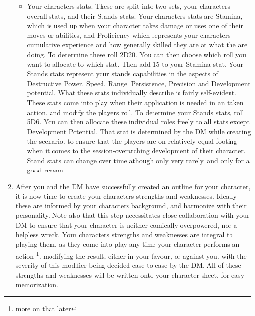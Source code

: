 \documentclass[a4paper,12pt]{article}
\begin{document}
\begin{enumerate}
\begin{itemize}
		\item Your characters stats. These are split into two sets, your characters overall stats, and their Stands stats. Your characters stats are Stamina, which is used up when your character takes damage or uses one of their moves or abilities, and Proficiency which represents your characters cumulative experience and how generally skilled they are at what the are doing. To determine these roll 2D20. You can then choose which roll you want to allocate to which stat. Then add 15 to your Stamina stat. Your Stands stats represent your stands capabilities in the aspects of Destructive Power, Speed, Range, Persistence, Precision and Development potential. What these stats individually describe is fairly self-evident. These stats come into play when their application is needed in an taken action, and modify the players roll. To determine your Stands stats, roll 5D6. You can then allocate these individual roles freely to all stats except Development Potential. That stat is determined by the DM while creating the scenario, to ensure that the players are on relatively equal footing when it comes to the session-overarching development of their character. Stand stats can change over time athough only very rarely, and only for a good reason.
	\end{itemize}
		\item After you and the DM have successfully created an outline for your character, it is now time to create your characters strengths and weaknesses. Ideally these are informed by your characters background, and harmonize with their personality. Note also that this step necessitates close collaboration with your DM to ensure that your character is neither comically overpowered, nor a helpless wreck. Your characters strengths and weaknesses are integral to playing them, as they come into play any time your character performs an action \footnote{more on that later}, modifying the result, either in your favour, or against you, with the severity of this modifier being decided case-to-case by the DM. All of these strengths and weaknesses will be written onto your character-sheet, for easy memorization.

\end{enumerate}
\end{document}
